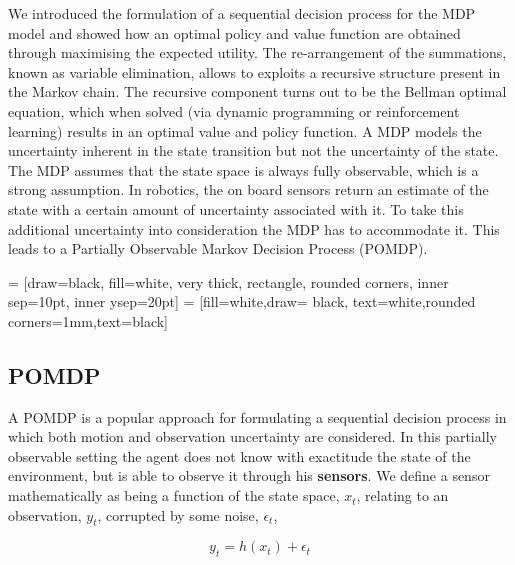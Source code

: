 We introduced the formulation of a sequential decision process for the MDP model and showed how an optimal policy 
and value function are obtained through maximising the expected utility. The re-arrangement of the summations, known as
variable elimination, allows to exploits a recursive structure present in the Markov chain. The recursive component 
turns out to be the Bellman optimal equation, which when solved (via dynamic programming or reinforcement learning) results 
in an optimal value and policy function. A MDP models the uncertainty inherent in the state transition but not the uncertainty 
of the state. The MDP assumes that the state space is always fully observable, which is a strong assumption. In robotics, the 
on board sensors return an estimate of the state with a certain amount of uncertainty associated with it. To take this additional
uncertainty into consideration the MDP has to accommodate it. This leads to a Partially Observable Markov Decision Process (POMDP).





  = [draw=black, fill=white, very thick,  rectangle, rounded corners, inner sep=10pt, inner ysep=20pt]
 = [fill=white,draw= black, text=white,rounded corners=1mm,text=black]


\subsection{POMDP}

A POMDP is a popular approach for formulating a sequential decision process in which both motion and observation 
uncertainty are considered. In this partially observable setting the agent does not know with exactitude the state of the environment,
but is able to observe it through his \textbf{sensors}. We define a sensor mathematically as being a function of the 
state space, $x_t$, relating to an observation, $y_t$, corrupted by some noise, $\epsilon_t$,

\begin{equation}\label{eq:sensor}
  y_t = h(x_t) + \epsilon_t
\end{equation}

